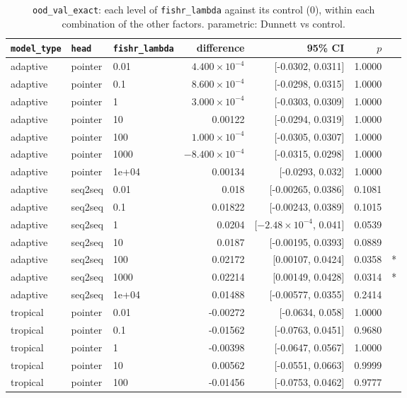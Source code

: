 \documentclass[10pt]{article}
\begin{document}
{\small
\begin{longtable}{lllrrrl}
\caption{\texttt{ood\_val\_exact}: each level of \texttt{fishr\_lambda} against its control (0), within each combination of the other factors. parametric: Dunnett vs control.}\label{tab:control-ood_val_exact}\\
\toprule
\texttt{model\_type} & \texttt{head} & \texttt{fishr\_lambda} & difference & 95\% CI & $p$ & \\
\midrule
\endhead
adaptive & pointer & 0.01 & $4.400\times10^{-4}$ & [-0.0302, 0.0311] & 1.0000 & \\
adaptive & pointer & 0.1 & $8.600\times10^{-4}$ & [-0.0298, 0.0315] & 1.0000 & \\
adaptive & pointer & 1 & $3.000\times10^{-4}$ & [-0.0303, 0.0309] & 1.0000 & \\
adaptive & pointer & 10 & 0.00122 & [-0.0294, 0.0319] & 1.0000 & \\
adaptive & pointer & 100 & $1.000\times10^{-4}$ & [-0.0305, 0.0307] & 1.0000 & \\
adaptive & pointer & 1000 & $-8.400\times10^{-4}$ & [-0.0315, 0.0298] & 1.0000 & \\
adaptive & pointer & 1e+04 & 0.00134 & [-0.0293, 0.032] & 1.0000 & \\
adaptive & seq2seq & 0.01 & 0.018 & [-0.00265, 0.0386] & 0.1081 & \\
adaptive & seq2seq & 0.1 & 0.01822 & [-0.00243, 0.0389] & 0.1015 & \\
adaptive & seq2seq & 1 & 0.0204 & [$-2.48\times10^{-4}$, 0.041] & 0.0539 & \\
adaptive & seq2seq & 10 & 0.0187 & [-0.00195, 0.0393] & 0.0889 & \\
adaptive & seq2seq & 100 & 0.02172 & [0.00107, 0.0424] & 0.0358 & *\\
adaptive & seq2seq & 1000 & 0.02214 & [0.00149, 0.0428] & 0.0314 & *\\
adaptive & seq2seq & 1e+04 & 0.01488 & [-0.00577, 0.0355] & 0.2414 & \\
tropical & pointer & 0.01 & -0.00272 & [-0.0634, 0.058] & 1.0000 & \\
tropical & pointer & 0.1 & -0.01562 & [-0.0763, 0.0451] & 0.9680 & \\
tropical & pointer & 1 & -0.00398 & [-0.0647, 0.0567] & 1.0000 & \\
tropical & pointer & 10 & 0.00562 & [-0.0551, 0.0663] & 0.9999 & \\
tropical & pointer & 100 & -0.01456 & [-0.0753, 0.0462] & 0.9777 & \\

\end{longtable}}
\end{document}
